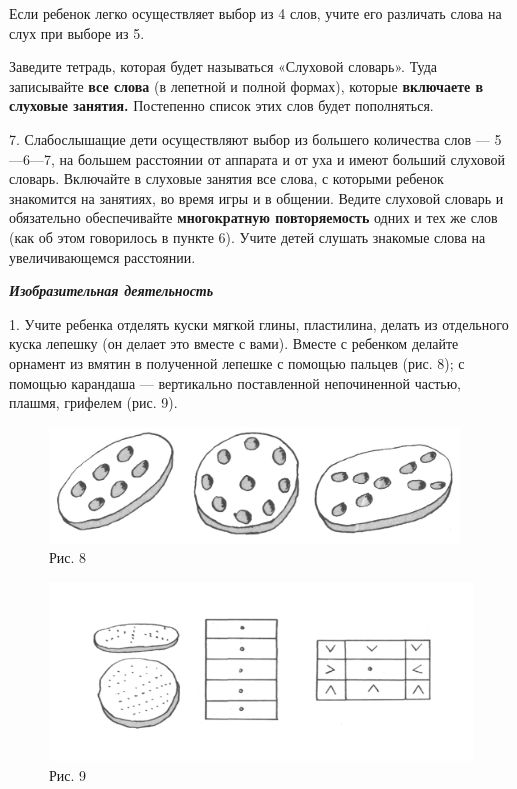 \documentclass[a5paper]{book}
\renewcommand{\emph}[1]{\textit{#1}}
\begin{document}
Если ребенок легко осуществляет выбор из 4 слов, учите его различать
слова на слух при выборе из 5.

Заведите тетрадь, которая будет называться «Слуховой словарь». Туда
записывайте \textbf{все слова} (в лепетной и полной формах), которые
\textbf{включаете в слуховые занятия.} Постепенно список этих слов будет
пополняться.

7. Слабослышащие дети осуществляют выбор из большего количества слов ---
5---6---7, на большем расстоянии от аппарата и от уха и имеют больший
слуховой словарь. Включайте в слуховые занятия все слова, с которыми
ребенок знакомится на занятиях, во время игры и в общении. Ведите
слуховой словарь и обязательно обеспечивайте \textbf{многократную
повторяемость} одних и тех же слов (как об этом говорилось в пункте 6).
Учите детей слушать знакомые слова на увеличивающемся расстоянии.

\emph{\textbf{Изобразительная деятельность}}

1. Учите ребенка отделять куски мягкой глины, пластилина, делать из
отдельного куска лепешку (он делает это вместе с вами). Вместе с
ребенком делайте орнамент из вмятин в полученной лепешке с помощью
пальцев (рис. 8); с помощью карандаша --- вертикально поставленной
непочиненной частью, плашмя, грифелем (рис. 9).

\begin{figure}
\centering
\includegraphics[width=4.27986in,height=1.22014in]{media/media/image8.jpg}
\caption*{Рис. 8}
\end{figure}

\begin{figure}
\centering
\includegraphics[width=\linewidth]{media/media/image9.png}
\caption*{Рис. 9}
\end{figure}
\end{document}
